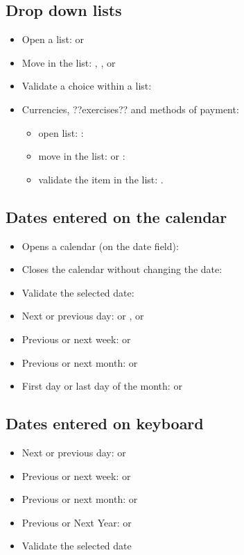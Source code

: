 \subsection{Drop down lists}

\begin{itemize}
	 \item Open a list:  or 
	 \item Move in the list: , ,  or 
	 \item Validate a choice within a list: 
	 \item Currencies, ??exercises?? and methods of payment:
		\begin{itemize}
			\item open list: : 
			\item move in the list:  or :
			\item validate the item in the list: .
		\end{itemize}
\end{itemize}


\subsection{Dates entered on the calendar}

\begin{itemize}
	\item Opens a calendar (on the date field): 
	\item Closes the calendar without changing the date: 
	\item Validate the selected date: 
	\item Next or previous day: \key{+} or \key{-},  or 
	\item Previous or next week:  or 
	\item Previous or next month:  or 
	\item First day or last day of the month:  or 
\end{itemize}


\subsection{Dates entered on keyboard }

\begin{itemize}
	\item Next or previous day: \key{+} or \key{-}
	\item Previous or next week:  \key{+} or  \key{-}
	\item Previous or next month:  or 
	\item Previous or Next Year:   or  
	\item Validate the selected date 
\end{itemize}


